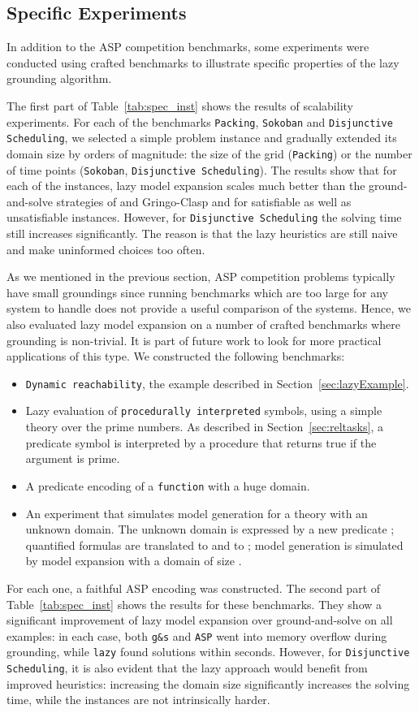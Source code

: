 \documentclass[11pt]{article}
\newcommand{\logicname}[1]{\text{\sc #1}\xspace}
\newcommand{\idp}{\logicname{IDP}}
\theoremstyle{plain}
\theoremstyle{definition}
\theoremstyle{example_basic}
\theoremstyle{example_contd}
\theoremstyle{plain}
\newcommand{\packing}			{\texttt{Packing}\xspace}
\newcommand{\sokoban}			{\texttt{Sokoban}\xspace}
\newcommand{\disjsched}			{\texttt{Disjunctive Scheduling}\xspace}
\newcommand{\change}[1]{#1}
\begin{document}
\subsection{Specific Experiments}\label{ssec:additionalexper}
In addition to the ASP competition benchmarks, some experiments were conducted using crafted benchmarks to illustrate specific properties of the lazy grounding algorithm.

The first part of Table~\ref{tab:spec_inst} shows the results of scalability experiments. For each of the benchmarks \packing, \sokoban and \disjsched, we selected a  simple problem instance and gradually extended its domain size by orders of magnitude: the size of the grid (\packing) or the number of time points (\sokoban, \disjsched). The results show that for each of the instances, lazy model expansion scales much better than the ground-and-solve strategies of \idp and Gringo-Clasp and for satisfiable as well as unsatisfiable instances. However, for \disjsched the solving time still increases significantly. The reason is that the lazy heuristics are still naive and make uninformed choices too often.

\change{As we mentioned in the previous section, ASP competition problems
  typically have small groundings since running benchmarks which are too
  large for any system to handle does not provide a useful comparison of
  the systems. 
  Hence, we also evaluated lazy model
  expansion on a number of crafted benchmarks where grounding is
  non-trivial. 
It is part of future work to look for more practical applications of this type. We constructed the following benchmarks:}
\begin{itemize}
  \item \texttt{Dynamic reachability}, the example described in Section~\ref{sec:lazyExample}.
  \item Lazy evaluation of \texttt{procedurally interpreted} symbols, using a simple theory over the prime numbers. As described in Section~\ref{sec:reltasks}, a predicate symbol  is interpreted by a procedure that returns true if the argument is prime.
  \item A predicate encoding of a \texttt{function} with a huge domain.
   \item  \change{An  experiment that simulates  model generation for a theory with an unknown domain.  The unknown domain is expressed by a new predicate ; quantified  formulas  are  translated to  and   to ; model generation is simulated by model expansion with  a domain of size . }
\end{itemize}
For each one, a faithful ASP encoding was constructed. \change{The second part of Table~\ref{tab:spec_inst} shows the results for these benchmarks. They show a significant improvement of lazy model expansion over ground-and-solve on all examples: in each case, both \texttt{g\&s} and \texttt{ASP} went into memory overflow during grounding, while \texttt{lazy} found solutions within seconds. However, for \disjsched, it is also evident that the lazy approach would benefit from improved heuristics: increasing the domain size significantly increases the solving time, while the instances are not intrinsically harder.}
\end{document}
